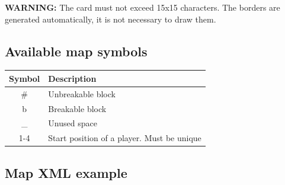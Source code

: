 \documentclass{article}
\begin{document}
\textbf{WARNING:} The card must not exceed 15x15 characters. The borders are generated
automatically, it is not necessary to draw them.  

\subsection{Available map symbols}

\begin{center}
\begin{tabular}{c | l}
\toprule
Symbol & Description \\
\midrule
\# & Unbreakable block \\
b & Breakable block \\
\_ & Unused space \\
1-4 & Start position of a player. Must be unique \\
\bottomrule
\end{tabular}
\end{center}

\subsection{Map XML example}


\end{document}
